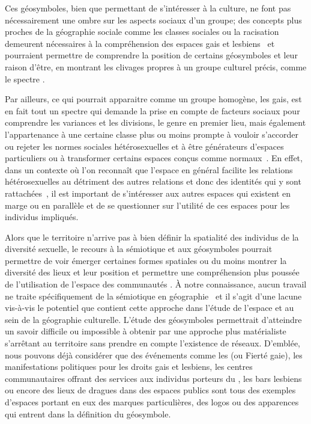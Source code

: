 Ces géosymboles, bien que permettant de s'intéresser à la culture, ne font pas nécessairement une ombre sur les aspects sociaux d'un groupe; des concepts plus proches de la géographie sociale comme les classes sociales ou la racisation~\citep{Bonniol2005} demeurent nécessaires à la compréhension des espaces gais et lesbiens~\citep[93]{Oswin2008} et pourraient permettre de comprendre la position de certains géosymboles et leur raison d'être, en montrant les clivages propres à un groupe culturel précis, comme le spectre \lgbt{}.

Par ailleurs, ce qui pourrait apparaitre comme un groupe homogène, les gais, est en fait tout un spectre qui demande la prise en compte de facteurs sociaux pour comprendre les variances et les divisions, le genre en premier lieu, mais également l'appartenance à une certaine classe plus ou moins prompte à vouloir s'accorder ou rejeter les normes sociales hétérosexuelles et à être générateurs d'espaces particuliers ou à transformer certains espaces conçus comme normaux~\citep{Lewis2011}. 
En effet, dans un contexte où l'on reconnaît que l'espace en général facilite les relations hétérosexuelles au détriment des autres relations et donc des identités qui y sont rattachées~\citep{Brown2003}, il est important de s'intéresser aux autres espaces qui existent en marge ou en parallèle et de se questionner sur l'utilité de ces espaces pour les individus impliqués.

Alors que le territoire n'arrive pas à bien définir la spatialité des individus de la diversité sexuelle, le recours à la sémiotique et aux géosymboles pourrait permettre de voir émerger certaines formes spatiales ou du moins montrer la diversité des lieux et leur position et permettre une compréhension plus poussée de l'utilisation de l'espace des communautés \lgbt{}. 
À notre connaissance, aucun travail ne traite spécifiquement de la sémiotique en géographie \qu\ et il s'agit d'une lacune vis-à-vis le potentiel que contient cette approche dans l'étude de l'espace et au sein de la géographie culturelle.
L'étude des géosymboles permettrait d'atteindre un savoir difficile ou impossible à obtenir par une approche plus matérialiste s'arrêtant au territoire sans prendre en compte l'existence de réseaux. 
D'emblée, nous pouvons déjà considérer que des événements comme les  (ou Fierté gaie), les manifestations politiques pour les droits gais et lesbiens, les centres communautaires offrant des services aux individus porteurs du \vih, les bars lesbiens ou encore des lieux de dragues dans des espaces publics sont tous des exemples d'espaces \lgbt{} portant en eux des marques particulières, des logos ou des apparences qui entrent dans la définition du géosymbole.

